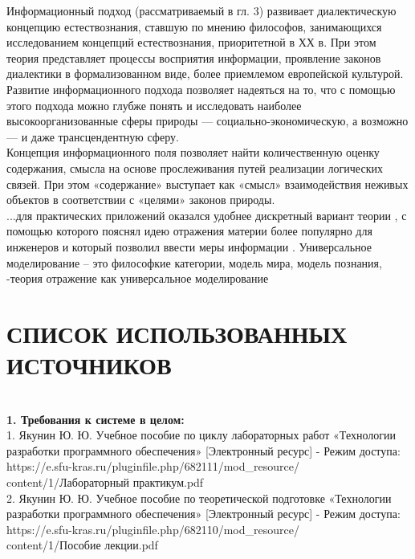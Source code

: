 \documentclass[a4paper,12pt]{report}
\begin{document}
Информационный подход (рассматриваемый в гл. 3) развивает диалектическую концепцию естествознания, ставшую по мнению философов, занимающихся исследованием концепций естествознания, приоритетной в ХХ в. При этом теория представляет процессы восприятия информации, проявление законов диалектики в формализованном виде, более приемлемом европейской культурой. Развитие информационного подхода позволяет надеяться на то, что с помощью этого подхода можно глубже понять и исследовать наиболее высокоорганизованные сферы природы — социально-экономическую, а возможно — и даже трансцендентную сферу.\\

Концепция информационного поля позволяет найти количественную оценку содержания, смысла на основе прослеживания путей реализации логических связей. При этом «содержание» выступает как «смысл» взаимодействия неживых объектов в соответствии с «целями» законов природы.\\
...для практических приложений оказался удобнее дискретный вариант теории , с помощью которого пояснял идею отражения материи более популярно для инженеров и который позволил ввести меры информации .
Универсальное моделирование – это философкие категории, модель мира, модель познания, -теория отражение как универсальное моделирование\\

	\chapter*{СПИСОК ИСПОЛЬЗОВАННЫХ ИСТОЧНИКОВ} 
\\
\textbf{1. Требования к системе в целом:} \\
1. Якунин Ю. Ю. Учебное пособие по циклу лабораторных работ  «Технологии разработки  
программного обеспечения» [Электронный ресурс] - Режим доступа: https://e.sfu-kras.ru/pluginfile.php/682111/mod\_resource/\\
content/1/Лабораторный практикум.pdf\\

2.  Якунин Ю. Ю. Учебное пособие по теоретической подготовке 
«Технологии разработки программного 
обеспечения» [Электронный ресурс] - Режим доступа: https://e.sfu-kras.ru/pluginfile.php/682110/mod\_resource/\\
content/1/Пособие лекции.pdf\\
    
   	
\end{document}

